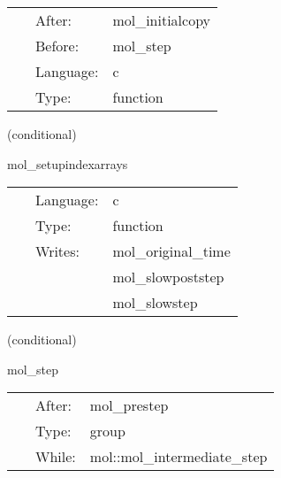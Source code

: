 \hspace{5mm}{\it automatically update valid regions based on mol } 


\hspace{5mm}

 \begin{tabular*}{160mm}{cll} 
~ & After:  & mol\_initialcopy \\ 
~ & Before:  & mol\_step \\ 
~ & Language:  & c \\ 
~ & Type:  & function \\ 
\end{tabular*} 


\vspace{5mm}

   (conditional) 

\hspace{5mm} mol\_setupindexarrays 

\hspace{5mm}{\it set up the mol bookkeeping index arrays } 


\hspace{5mm}

 \begin{tabular*}{160mm}{cll} 
~ & Language:  & c \\ 
~ & Type:  & function \\ 
~ & Writes:  & mol\_original\_time \\ 
~& ~ &mol\_slowpoststep\\ 
~& ~ &mol\_slowstep\\ 
\end{tabular*} 


\vspace{5mm}

   (conditional) 

\hspace{5mm} mol\_step 

\hspace{5mm}{\it the loop over the intermediate steps for the ode integrator } 


\hspace{5mm}

 \begin{tabular*}{160mm}{cll} 
~ & After:  & mol\_prestep \\ 
~ & Type:  & group \\ 
~ & While:  & mol::mol\_intermediate\_step \\ 
\end{tabular*} 


